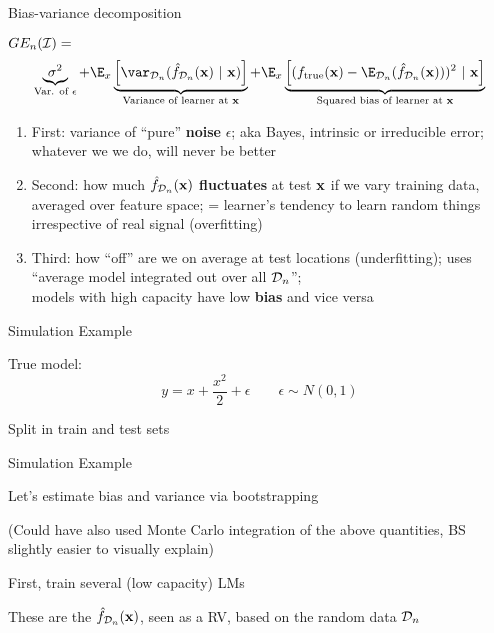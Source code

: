 \documentclass[11pt,compress,t,notes=noshow, xcolor=table]{beamer}
\begin{document}
\begin{frame}{Bias-variance decomposition}


$GE_n(\mathcal{I}) =$  
$$
 \underbrace{\sigma^2}_{\text{Var. of $\epsilon$}} + \E_{x}\underbrace{\left[\var_{\D_n}(\fh_{\D_n}(\xv) ~|~\xv)\right]}_{\text{Variance of learner at } \xv} + \E_{x}\underbrace{\left[(\ftrue(\xv)-\E_{\D_n}(\fh_{\D_n}(\xv)))^2~|~\xv\right]}_{\text{Squared bias of learner at } \xv}  
$$

\begin{enumerate}
  \item First: variance of ``pure''
     \textbf{noise} $\epsilon$; aka Bayes, intrinsic or irreducible error; 
    whatever we we do, will never be better
  \item Second: how much \textbf{$\hat{f}_{\mathcal{D}_n}(\mathbf{x})$ fluctuates} at test $\mathbf{x}$ if we vary training data, averaged over feature space; = learner's tendency to learn random things irrespective of real signal (overfitting)
  
  \item Third: how ``off'' are we on average at test locations (underfitting); uses ``average model integrated out over all $\mathcal{D}_n$''; \\
  models with high capacity have low \textbf{bias} and vice versa
\end{enumerate}


\end{frame} 

\begin{framei}[sep=L]{Simulation Example}

\item True model:
$$y = x + \frac{x^2}{2} + \epsilon  \qquad \epsilon \sim 
N (0, 1)$$
\item Split in train and test sets 


\end{framei} 


\begin{framei}[sep=M]{Simulation Example}

\item Let's estimate bias and variance via bootstrapping

\item (Could have also used Monte Carlo integration of the above quantities,
BS slightly easier to visually explain)

\item First, train several (low capacity) LMs
\item These are the $\hat{f}_{\mathcal{D}_n}(\mathbf{x})$, seen as a RV, based on the random
data $\mathcal{D}_n$

\splitVCC
  {}
  {}

\end{framei} 
\end{document}
